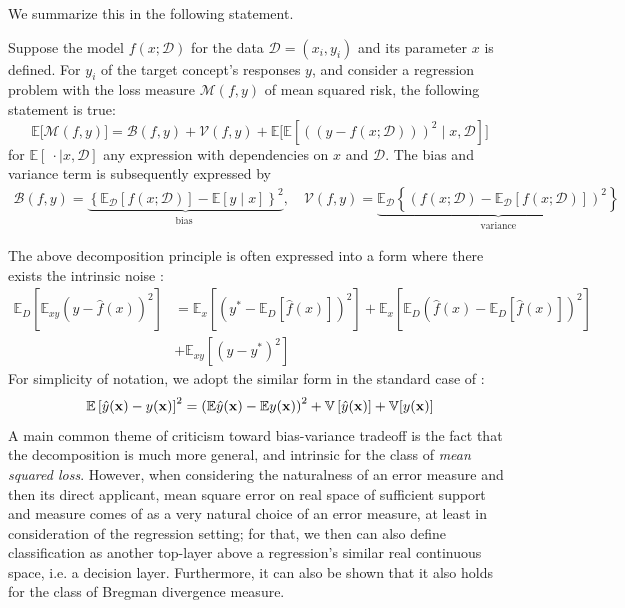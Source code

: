 \documentclass[10pt]{article} %
\begin{document}
We summarize this in the following statement. 

\begin{theorem}
    Suppose the model $f(x;\mathcal{D})$ for the data $\mathcal{D}=(x_i, y_i)$ and its parameter $x$ is defined. For $y_{i}$ of the target concept's responses $y$, and consider a regression problem with the loss measure $\mathcal{M}(f,y)$ of mean squared risk, the following statement is true: \begin{equation}
        \mathbb{E}\big[\mathcal{M}(f,y)\big] = \mathcal{B}(f,y) + \mathcal{V}(f,y) + \mathbb{E}\Big[\mathbb{E} \left[((y-f(x;\mathcal{D})))^{2}\mid x, \mathcal{D}\right]\Big]
    \end{equation}
    for $\mathbb{E}[\:\cdot\mid x, \mathcal{D}]$ any expression with dependencies on $x$ and $\mathcal{D}$. The bias and variance term is subsequently expressed by 
    \begin{align}
        \mathcal{B}(f,y) = \underbrace{\left\{ \mathbb{E}_{\mathcal{D}}[f(x;\mathcal{D})] - \mathbb{E}[y\mid x] \right\}^{2}}_{\text{bias }}, \quad \mathcal{V}(f,y) =\underbrace{\mathbb{E}_{\mathcal{D}} \left\{(f(x;\mathcal{D})- \mathbb{E}_{\mathcal{D}}[f(x;\mathcal{D})])^{2}\right\}}_{\text{variance}}
    \end{align}
\end{theorem}

The above decomposition principle is often expressed into a form where there exists the intrinsic noise \cite{brown2024biasvariance}: 
\begin{equation}
    \begin{split}
        \mathbb{E}_D \left[ \mathbb{E}_{xy} \left( y - \hat{f}(x) \right)^2 \right]
        &= 
         \mathbb{E}_x \left[ \left( y^* - \mathbb{E}_D[\hat{f}(x)] \right)^2 \right]
        + \mathbb{E}_x \left[ \mathbb{E}_D \left( \hat{f}(x) - \mathbb{E}_D[\hat{f}(x)] \right)^2 \right] \\
        &+ \mathbb{E}_{xy} \left[ \left( y - y^* \right)^2 \right]
    \end{split}
    \end{equation}
For simplicity of notation, we adopt the similar form in the standard case of \cite{adlam2020understandingdoubledescentrequires}: 
\begin{equation}
    \mathbb{E} \left[{\hat{y}(\mathbf{x})-y(\mathbf{x})}\right]^2 = \left({\mathbb{E}\hat{y}(\mathbf{x}) - \mathbb{E} y(\mathbf{x})}\right)^2 + \mathbb{V}\left[{\hat{y}(\mathbf{x})}\right] + \mathbb{V}[{y(\mathbf{x})}]
\end{equation}
A main common theme of criticism toward bias-variance tradeoff is the fact that the decomposition is much more general, and intrinsic for the class of \textit{mean squared loss}. However, when considering the naturalness of an error measure and then its direct applicant, mean square error on real space of sufficient support and measure comes of as a very natural choice of an error measure, at least in consideration of the regression setting; for that, we then can also define classification as another top-layer above a regression's similar real continuous space, i.e. a decision layer. Furthermore, it can also be shown \cite{brown2024biasvariance,PfauBregmanDivergence} that it also holds for the class of Bregman divergence measure. 
\end{document}
